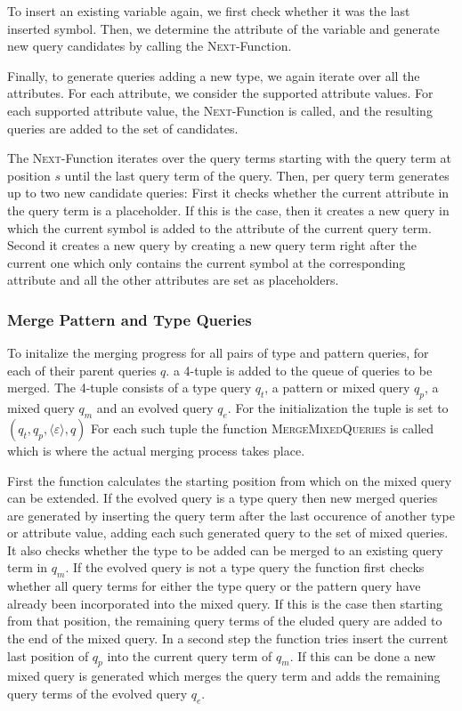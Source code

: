 To insert an existing variable again, we first check whether it
was the last inserted symbol.
Then, we determine the attribute of the variable and generate
new query candidates by calling the \textsc{Next}-Function.

Finally, to generate queries adding a new type, we again iterate
over all the attributes. For each attribute, we consider the
supported attribute values. For each supported attribute value,
the \textsc{Next}-Function is called, and the resulting queries
are added to the set of candidates.

The \textsc{Next}-Function iterates over the query terms starting
with the query term at position $s$ until the last query term of the query.
Then, per query term generates up to two new candidate queries:
First it checks whether the current attribute in the query term
is a placeholder. If this is the case, then it creates a new query
in which the current symbol is added to the attribute of the
current query term. Second it creates a new query by creating
a new query term right after the current one which only contains
the current symbol at the corresponding attribute and all the
other attributes are set as placeholders.



\subsubsection{Merge Pattern and Type Queries}
\label{sec:comp-tp}
To initalize the merging progress for all pairs of
type and pattern queries, for each of their parent queries $q$.
a 4-tuple is added to the queue of queries to be merged.
The 4-tuple consists of a type query $q_t$, a pattern or mixed query
$q_p$, a mixed query $q_m$ and an evolved query $q_e$. For the
initialization the tuple is set to
$(q_t, q_p, \langle\varepsilon\rangle, q)$
For each such tuple the function \textsc{MergeMixedQueries} is
called which is where the actual merging process takes place.

First the function calculates the starting position from which on
the mixed query can be extended.
If the evolved query is a type query then new merged queries are
generated by inserting the query term after the last occurence of another
type or attribute value,
adding each such generated query to the set of mixed queries.
It also checks whether the type to be added can be merged to an existing
query term in $q_m$.
If the evolved query is not a type query the function first checks
whether all query terms for either the type query or the pattern
query have already been incorporated into the mixed query.
If this is the case then starting from that position, the remaining
query terms of the eluded query are added to the end of the mixed query.
In a second step the function tries insert the current last position of
$q_p$ into the current query term of $q_m$. If this can be done
a new mixed query is generated which merges the query term and adds
the remaining query terms of the evolved query $q_e$.

